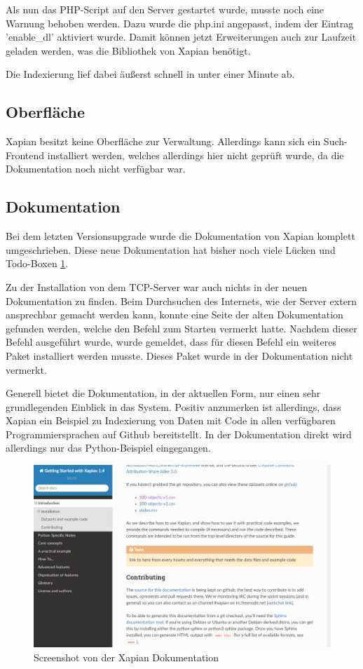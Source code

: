Als nun das PHP-Script auf den Server gestartet wurde, musste noch eine Warnung behoben werden. Dazu wurde die php.ini angepasst, indem der Eintrag 'enable\_dl' aktiviert wurde. Damit können jetzt Erweiterungen auch zur Laufzeit geladen werden, was die Bibliothek von Xapian benötigt.

Die Indexierung lief dabei äußerst schnell in unter einer Minute ab.

\subsection{Oberfläche}

Xapian besitzt keine Oberfläche zur Verwaltung. Allerdings kann sich ein Such-Frontend installiert werden, welches allerdings hier nicht geprüft wurde, da die Dokumentation noch nicht verfügbar war.

\subsection{Dokumentation}

Bei dem letzten Versionsupgrade wurde die Dokumentation von Xapian komplett umgeschrieben. Diese neue Dokumentation hat bisher noch viele Lücken und Todo-Boxen \ref{img:xapianDoku}.

Zu der Installation von dem TCP-Server war auch nichts in der neuen Dokumentation zu finden. Beim Durchsuchen des Internets, wie der Server extern ansprechbar gemacht werden kann, konnte eine Seite der alten Dokumentation gefunden werden, welche den Befehl zum Starten vermerkt hatte. Nachdem dieser Befehl ausgeführt wurde, wurde gemeldet, dass für diesen Befehl ein weiteres Paket installiert werden musste. Dieses Paket wurde in der Dokumentation nicht vermerkt. 

Generell bietet die Dokumentation, in der aktuellen Form, nur einen sehr grundlegenden Einblick in das System. Positiv anzumerken ist allerdings, dass Xapian ein Beispiel zu Indexierung von Daten mit Code in allen verfügbaren Programmiersprachen auf Github bereitstellt. In der Dokumentation direkt wird allerdings nur das Python-Beispiel eingegangen.

\begin{figure}
	\centering
	\includegraphics[width=1\linewidth]{images/xapian_doku.png}
	\caption{Screenshot von der Xapian Dokumentation}
	\label{img:xapianDoku}
\end{figure}

